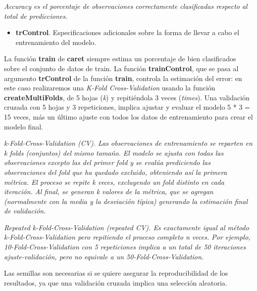 \documentclass[]{article}
\newenvironment{Shaded}{\begin{snugshade}}{\end{snugshade}}
\newcommand{\DataTypeTok}[1]{\textcolor[rgb]{0.13,0.29,0.53}{#1}}
\newcommand{\DecValTok}[1]{\textcolor[rgb]{0.00,0.00,0.81}{#1}}
\newcommand{\KeywordTok}[1]{\textcolor[rgb]{0.13,0.29,0.53}{\textbf{#1}}}
\newcommand{\NormalTok}[1]{#1}
\newcommand{\OperatorTok}[1]{\textcolor[rgb]{0.81,0.36,0.00}{\textbf{#1}}}
\newcommand{\OtherTok}[1]{\textcolor[rgb]{0.56,0.35,0.01}{#1}}
\newcommand{\StringTok}[1]{\textcolor[rgb]{0.31,0.60,0.02}{#1}}
\providecommand{\tightlist}{%
  \setlength{\itemsep}{0pt}\setlength{\parskip}{0pt}}
\begin{document}
\emph{Accuracy es el porcentaje de observaciones correctamente
clasificadas respecto al total de predicciones.}

\begin{itemize}
\tightlist
\item
  \textbf{trControl}. Especificaciones adicionales sobre la forma de
  llevar a cabo el entrenamiento del modelo.
\end{itemize}

La función \textbf{train} de \textbf{caret} siempre estima un porcentaje
de bien clasificados sobre el conjunto de datos de train. La función
\textbf{trainControl}, que se pasa al argumento \textbf{trControl} de la
función \textbf{train}, controla la estimación del error: en este caso
realizaremos una \emph{K-Fold Cross-Validation} usando la función
\textbf{createMultiFolds}, de 5 hojas (\emph{k}) y repitiéndola 3 veces
(\emph{times}). Una validación cruzada con 5 hojas y 3 repeticiones,
implica ajustar y evaluar el modelo 5 * 3 = 15 veces, más un último
ajuste con todos los datos de entrenamiento para crear el modelo final.

\emph{k-Fold-Cross-Validation (CV). Las observaciones de entrenamiento
se reparten en k folds (conjuntos) del mismo tamaño. El modelo se ajusta
con todas las observaciones excepto las del primer fold y se evalúa
prediciendo las observaciones del fold que ha quedado excluido,
obteniendo así la primera métrica. El proceso se repite k veces,
excluyendo un fold distinto en cada iteración. Al final, se generan k
valores de la métrica, que se agregan (normalmente con la media y la
desviación típica) generando la estimación final de validación.}

\emph{Repeated k-Fold-Cross-Validation (repeated CV). Es exactamente
igual al método k-Fold-Cross-Validation pero repitiendo el proceso
completo n veces. Por ejemplo, 10-Fold-Cross-Validation con 5
repeticiones implica a un total de 50 iteraciones ajuste-validación,
pero no equivale a un 50-Fold-Cross-Validation.}

Las semillas son necesarias si se quiere asegurar la reproducibilidad de
los resultados, ya que una validación cruzada implica una selección
aleatoria.

\begin{Shaded}
\end{Shaded}
\end{document}
